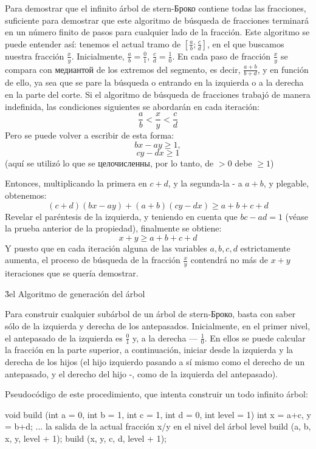 Para demostrar que el infinito árbol de stern-Броко contiene todas las fracciones, suficiente para demostrar que este algoritmo de búsqueda de fracciones terminará en un número finito de pasos para cualquier lado de la fracción. Este algoritmo se puede entender así: tenemos el actual tramo de $\left[ \frac{a}{b}; \frac{c}{d} \right]$, en el que buscamos nuestra fracción $\frac{x}{y}$. Inicialmente, $\frac{a}{b}=\frac{0}{1}$, $\frac{c}{d}=\frac{1}{0}$. En cada paso de fracción $\frac{x}{y}$ se compara con медиантой de los extremos del segmento, es decir, $\frac{a+b}{b+d}$, y en función de ello, ya sea que se pare la búsqueda o entrando en la izquierda o a la derecha en la parte del corte. Si el algoritmo de búsqueda de fracciones trabajó de manera indefinida, las condiciones siguientes se abordarán en cada iteración:
$$ \frac{a}{b} < \frac{x}{y} < \frac{c}{d} $$
Pero se puede volver a escribir de esta forma:
$$ bx-ay \ge 1, $$
$$ cy-dx \ge 1 $$
(aquí se utilizó lo que se целочисленны, por lo tanto, de $>0$ debe $\ge 1$)

Entonces, multiplicando la primera en $c+d$, y la segunda-la - a $a+b$, y plegable, obtenemos:
$$ (c+d)(bx-ay) + (a+b)(cy-dx) \ge a+b+c+d $$
Revelar el paréntesis de la izquierda, y teniendo en cuenta que $bc-ad=1$ (véase la prueba anterior de la propiedad), finalmente se obtiene:
$$ x+y \ge a+b+c+d $$
Y puesto que en cada iteración alguna de las variables $a, b, c, d$ estrictamente aumenta, el proceso de búsqueda de la fracción $\frac{x}{y}$ contendrá no más de $x+y$ iteraciones que se quería demostrar.

\h3{el Algoritmo de generación del árbol}

Para construir cualquier subárbol de un árbol de stern-Броко, basta con saber sólo de la izquierda y derecha de los antepasados. Inicialmente, en el primer nivel, el antepasado de la izquierda es $\frac{0}{1}$ y, a la derecha --- $\frac{1}{0}$. En ellos se puede calcular la fracción en la parte superior, a continuación, iniciar desde la izquierda y la derecha de los hijos (el hijo izquierdo pasando a sí mismo como el derecho de un antepasado, y el derecho del hijo -, como de la izquierda del antepasado).

Pseudocódigo de este procedimiento, que intenta construir un todo infinito árbol:

\code
void build (int a = 0, int b = 1, int c = 1, int d = 0, int level = 1) {
int x = a+c, y = b+d;
... la salida de la actual fracción x/y en el nivel del árbol level
build (a, b, x, y, level + 1);
build (x, y, c, d, level + 1);
}
\endcode

